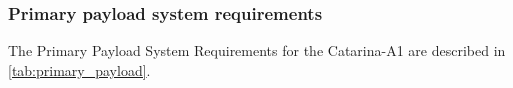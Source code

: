 

\subsubsection{Primary payload system requirements} \label{sec:primary_payload_system_requirements}

The Primary Payload System Requirements for the Catarina-A1 are described in \autoref{tab:primary_payload}.


